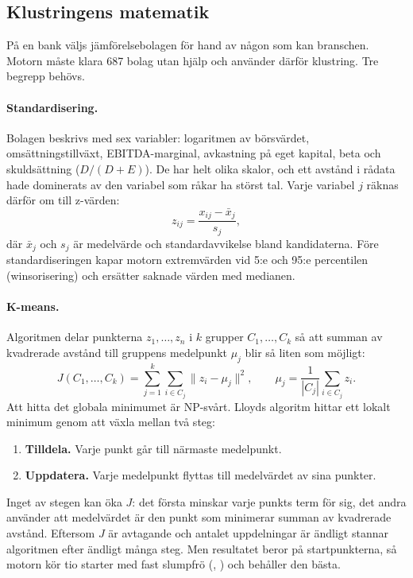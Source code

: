 \subsection{Klustringens matematik}

På en bank väljs jämförelsebolagen för hand av någon som kan branschen. Motorn måste klara 687
bolag utan hjälp och använder därför klustring. Tre begrepp behövs.

\paragraph{Standardisering.} Bolagen beskrivs med sex variabler: logaritmen av börsvärdet,
omsättningstillväxt, EBITDA-marginal, avkastning på eget kapital, beta och skuldsättning
($D/(D+E)$). De har helt olika skalor, och ett avstånd i rådata hade dominerats av den
variabel som råkar ha störst tal. Varje variabel $j$ räknas därför om till z-värden:
\begin{equation}
  z_{ij} = \frac{x_{ij} - \bar x_j}{s_j},
  \label{eq:z}
\end{equation}
där $\bar x_j$ och $s_j$ är medelvärde och standardavvikelse bland kandidaterna. Före
standardiseringen kapar motorn extremvärden vid 5:e och 95:e percentilen (winsorisering) och
ersätter saknade värden med medianen.

\paragraph{K-means.} Algoritmen delar punkterna $z_1, \dots, z_n$ i $k$ grupper
$C_1, \dots, C_k$ så att summan av kvadrerade avstånd till gruppens medelpunkt $\mu_j$ blir så
liten som möjligt:
\begin{equation}
  J(C_1, \dots, C_k) = \sum_{j=1}^{k} \sum_{i \in C_j} \lVert z_i - \mu_j \rVert^2,
  \qquad \mu_j = \frac{1}{|C_j|} \sum_{i \in C_j} z_i .
  \label{eq:kmeans}
\end{equation}
Att hitta det globala minimumet är NP-svårt. Lloyds algoritm hittar ett lokalt minimum genom
att växla mellan två steg:

\begin{enumerate}
  \item \textbf{Tilldela.} Varje punkt går till närmaste medelpunkt.
  \item \textbf{Uppdatera.} Varje medelpunkt flyttas till medelvärdet av sina punkter.
\end{enumerate}

Inget av stegen kan öka $J$: det första minskar varje punkts term för sig, det andra använder
att medelvärdet är den punkt som minimerar summan av kvadrerade avstånd. Eftersom $J$ är
avtagande och antalet uppdelningar är ändligt stannar algoritmen efter ändligt många steg. Men
resultatet beror på startpunkterna, så motorn kör tio starter med fast slumpfrö
(, ) och behåller den bästa.

